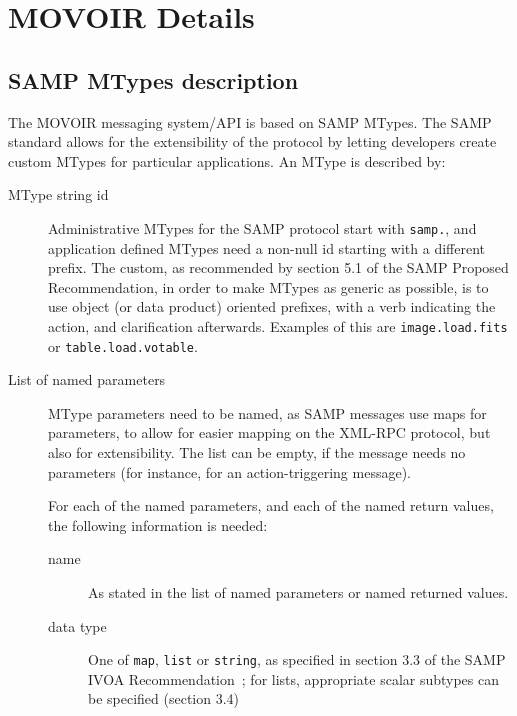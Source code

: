 \chapter{MOVOIR Details} %
\label{cha:movoir_details}

	\section{SAMP MTypes description} %
	\label{sec:samp_mtypes}
		
		The MOVOIR messaging system/API is based on SAMP MTypes.
		The SAMP standard allows for the extensibility of the
		protocol by letting developers create custom MTypes for
		particular applications. An MType is described by:
		
		\begin{description}
			\item[MType string id] Administrative MTypes for the
			SAMP protocol start with \texttt{samp.}, and application
			defined MTypes need a non-null id starting with a
			different prefix. The custom, as recommended by section
			5.1 of the SAMP Proposed Recommendation, in order to
			make MTypes as generic as possible, is to use object (or
			data product) oriented prefixes, with a verb indicating
			the action, and clarification afterwards. Examples of
			this are \texttt{image.load.fits} or
			\texttt{table.load.votable}.
			
			 \item[List of named parameters] MType parameters need
			to be named, as SAMP messages use maps for parameters,
			to allow for easier mapping on the XML-RPC protocol, but
			also for extensibility. The list can be empty, if the
			message needs no parameters (for instance, for an
			action-triggering message).
			
			For each of the named parameters, and each of the named
			return values, the following information is needed:
			
			\begin{description}
				\item[name] As stated in the list of named
				parameters or named returned values.
				
				\item[data type] One of \texttt{map},
				\texttt{list} or \texttt{string}, as specified in
				section 3.3 of the SAMP
				IVOA Recommendation~\cite{2009samp.ivoav0904T}; for
				lists, appropriate scalar subtypes can be specified
				(section 3.4)
				

\end{description}
\end{description}
